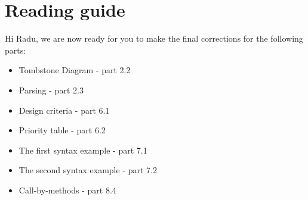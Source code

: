 \section{Reading guide}
Hi Radu, we are now ready for you to make the final corrections for the following parts:
\begin{itemize}
\item Tombstone Diagram - part 2.2
\item Parsing - part 2.3
\item Design criteria - part 6.1
\item Priority table - part 6.2
\item The first syntax example - part 7.1 
\item The second syntax example - part 7.2
\item Call-by-methods - part 8.4
\end{itemize}
